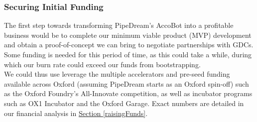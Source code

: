 \documentclass[11pt]{article}		%
\newcommand{\sectref}[1]{\hyperref[#1]{Section \ref*{#1}}}     %
\begin{document}
    	\subsubsection{Securing Initial Funding}
    	The first step towards transforming PipeDream’s AccoBot into a profitable business would be to complete our minimum viable product (MVP) development and obtain a proof-of-concept we can bring to negotiate partnerships with GDCs. Some funding is needed for this period of time, as this could take a while, during which our burn rate could exceed our funds from bootstrapping. 
        \\ \hspace*{3ex} We could thus use leverage the multiple accelerators and pre-seed funding available across Oxford (assuming PipeDream starts as an Oxford spin-off) such as the Oxford Foundry’s All-Innovate competition, as well as incubator programs such as OX1 Incubator and the Oxford Garage. Exact numbers are detailed in our financial analysis in \sectref{raisingFunds}. 
    
\end{document}
